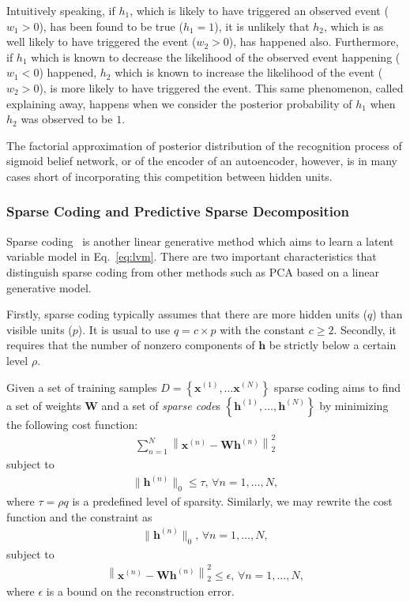\documentclass{now}
\newcommand{\vect}[1]{\mathbf{#1}}
\newcommand{\matr}[1]{\mathbf{#1}}
\newcommand{\vh}[0]{\vect{h}}
\newcommand{\vx}[0]{\vect{x}}
\newcommand{\mW}[0]{\matr{W}}
\begin{document}
Intuitively speaking, if $h_1$, which is likely to have triggered an observed
event ($w_1 > 0$), has been found to be true ($h_1=1$), it is unlikely that
$h_2$, which is as well likely to have triggered the event ($w_2 > 0$), has
happened also. Furthermore, if $h_1$ which is known to decrease the likelihood
of the observed event happening ($w_1 < 0$) happened, $h_2$ which is known to
increase the likelihood of the event ($w_2 > 0$), is more likely to have
triggered the event.  This same phenomenon, called explaining away, happens when
we consider the posterior probability of $h_1$ when $h_2$ was observed to be
$1$. 

The factorial approximation of posterior distribution of the recognition process
of sigmoid belief network, or of the encoder of an autoencoder, however, is in
many cases short of incorporating this competition between hidden units.

\subsubsection{Sparse Coding and Predictive Sparse
Decomposition}
\label{sec:sparse_coding}

Sparse coding~\citep[see, e.g.,][]{Olshausen1996} is another linear generative
method which aims to learn a latent variable model in Eq.~\eqref{eq:lvm}. There
are two important characteristics that distinguish sparse coding from other
methods such as PCA based on a linear generative model.

Firstly, sparse coding typically assumes that there are more hidden units ($q$)
than visible units ($p$). It is usual to use $q = c \times p$ with the constant
$c \geq 2$. Secondly, it requires that the number of nonzero components of $\vh$
be strictly below a certain level $\rho$.

Given a set of training samples $D=\left\{ \vx^{(1)}, \dots \vx^{(N)} \right\}$
sparse coding aims to find a set of weights $\mW$ and a set of \textit{sparse
code}s $\left\{ \vh^{(1)}, \dots, \vh^{(N)} \right\}$ by minimizing the
following cost function:
\begin{align}
    \label{eq:sp_cost_orig}
    \sum_{n=1}^N \left\| \vx^{(n)} - \mW \vh^{(n)}
    \right\|_2^2
\end{align}
subject to
\begin{align}
    \label{eq:sp_const_orig}
    \| \vh^{(n)} \|_0 \leq \tau\text{, }\forall n=1,\dots,N,
\end{align}
where $\tau=\rho q$ is a predefined level of sparsity. Similarly, we may rewrite
the cost function and the constraint as
\begin{align}
    \label{eq:cs_cost}
    \| \vh^{(n)} \|_0 \text{, }\forall n=1,\dots,N,
\end{align}
subject to
\begin{align*}
    \left\| \vx^{(n)} - \mW \vh^{(n)} \right\|_2^2 \leq
    \epsilon\text{, }\forall n=1,\dots,N,
\end{align*}
where $\epsilon$ is a bound on the reconstruction error.
\end{document}

